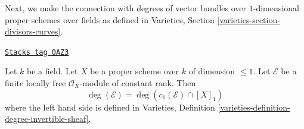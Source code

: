 Next, we make the connection with degrees of vector bundles
over $1$-dimensional proper schemes over fields as defined in
Varieties, Section \ref{varieties-section-divisors-curves}.

\begin{lemma}
\label{chow-lemma-degree-vector-bundle}
\href{https://stacks.math.columbia.edu/tag/0AZ3}{\texttt{Stacks tag 0AZ3}}

Let $k$ be a field. Let $X$ be a proper scheme over $k$ of dimension $\leq 1$.
Let $\mathcal{E}$ be a finite locally free $\mathcal{O}_X$-module of constant
rank. Then
$$
\deg(\mathcal{E}) = \deg(c_1(\mathcal{E}) \cap [X]_1)
$$
where the left hand side is defined in
Varieties, Definition \ref{varieties-definition-degree-invertible-sheaf}.
\end{lemma}

